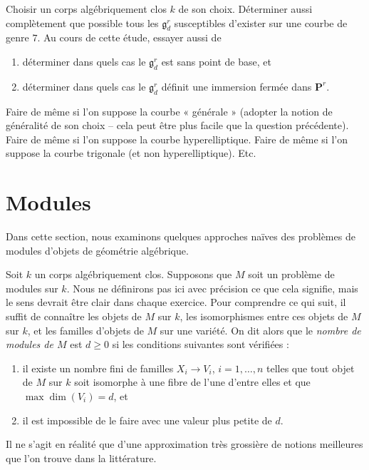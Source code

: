 \begin{exercise}
\label{exercise-genus-7}
Choisir un corps algébriquement clos $k$ de son choix.
Déterminer aussi complètement que possible tous les $\mathfrak g^r_d$
susceptibles d'exister sur une courbe de genre $7$.
Au cours de cette étude, essayer aussi de
\begin{enumerate}
\item déterminer dans quels cas le $\mathfrak g^r_d$ est sans point de base, et
\item déterminer dans quels cas le $\mathfrak g^r_d$ définit une immersion fermée
dans $\mathbf{P}^r$.
\end{enumerate}
Faire de même si l'on suppose la courbe « générale » (adopter
la notion de généralité de son choix -- cela peut être plus facile que la question précédente).
Faire de même si l'on suppose la courbe hyperelliptique.
Faire de même si l'on suppose la courbe trigonale
(et non hyperelliptique). Etc.
\end{exercise}





\section{Modules}
\label{section-moduli}

\noindent
Dans cette section, nous examinons quelques approches naïves des problèmes de modules
d'objets de géométrie algébrique.

\medskip\noindent
Soit $k$ un corps algébriquement clos. Supposons que $M$ soit un
problème de modules sur $k$. Nous ne définirons pas ici avec précision
ce que cela signifie, mais le sens devrait être clair dans chaque exercice.
Pour comprendre ce qui suit, il suffit de connaître
les objets de $M$ sur $k$, les isomorphismes entre
ces objets de $M$ sur $k$, et les familles d'objets de $M$
sur une variété. On dit alors que le {\it nombre de modules de $M$}
est $d \geq 0$ si les conditions suivantes sont vérifiées :
\begin{enumerate}
\item il existe un nombre fini de familles $X_i \to V_i$, $i = 1, \ldots, n$
telles que tout objet de $M$ sur $k$ soit isomorphe à une fibre de l'une
d'entre elles et que $\max \dim(V_i) = d$, et
\item il est impossible de le faire avec une valeur plus petite de $d$.
\end{enumerate}
Il ne s'agit en réalité que d'une approximation très grossière de notions meilleures
que l'on trouve dans la littérature.

